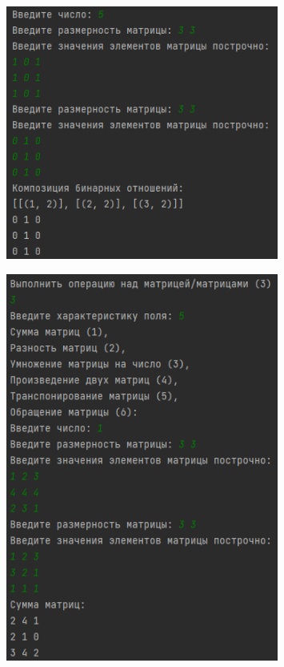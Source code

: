 \documentclass[bachelor, och, labwork]{shiza}
\begin{document}
        \begin{figure}[H]
            \centering
            \includegraphics[width=0.8\textwidth]{pic/7.png}
            \caption{}
        \end{figure}

        \begin{figure}[H]
            \centering
            \includegraphics[width=0.8\textwidth]{pic/8.png}
            \caption{}
        \end{figure}
\end{document}
